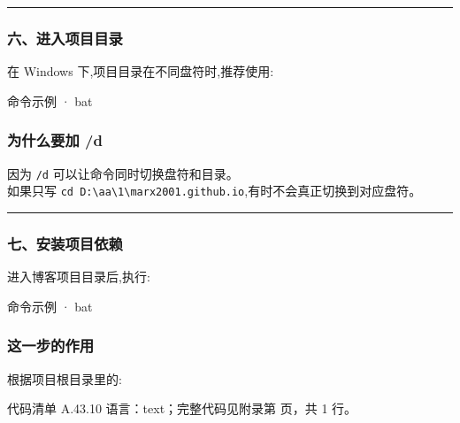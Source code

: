 \documentclass[lang=cn,scheme=chinese,color=blue,device=normal,toc=onecol,math=cm]{elegantbook}
\begin{document}
\medskip\hrule\medskip


\subsubsection{六、进入项目目录}


在 Windows 下,项目目录在不同盘符时,推荐使用:\par


\begin{inlinecodebox}{命令示例 · bat}
\end{inlinecodebox}


\subsubsection{为什么要加 /\allowbreak{}d}


因为 \texttt{/\allowbreak{}d} 可以让命令同时切换盘符和目录。\\ 如果只写 \texttt{cd D:\textbackslash{}\allowbreak{}aa\textbackslash{}\allowbreak{}1\textbackslash{}\allowbreak{}marx2001.github.io},有时不会真正切换到对应盘符。\par


\medskip\hrule\medskip


\subsubsection{七、安装项目依赖}


进入博客项目目录后,执行:\par


\begin{inlinecodebox}{命令示例 · bat}
\end{inlinecodebox}


\subsubsection{这一步的作用}


根据项目根目录里的:\par


\begin{codeindexbox}{代码清单 A.43.10}
语言：text；完整代码见附录第 \pageref{code:43:10} 页，共 1 行。
\end{codeindexbox}
\end{document}
